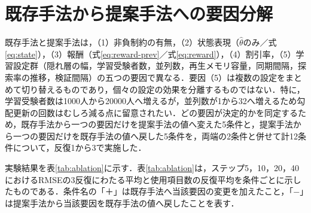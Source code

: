 \documentclass[a4paper,12pt,oneside,openany]{jsbook}
\begin{document}
\section{既存手法から提案手法への要因分解}\label{sec:ablation}

既存手法と提案手法は，（1）非負制約の有無，（2）状態表現（$\hat\theta$のみ／式\eqref{eq:state}），（3）報酬（式\eqref{eq:reward-prev}／式\eqref{eq:reward}），（4）割引率，（5）学習設定群（隠れ層の幅，学習受験者数，並列数，再生メモリ容量，同期間隔，探索率の推移，検証間隔）の五つの要因で異なる．要因（5）は複数の設定をまとめて切り替えるものであり，個々の設定の効果を分離するものではない．特に，学習受験者数は1000人から20000人へ増えるが，並列数が1から32へ増えるため勾配更新の回数はむしろ減る点に留意されたい．どの要因が決定的かを同定するため，既存手法から一つの要因だけを提案手法の値へ変えた5条件と，提案手法から一つの要因だけを既存手法の値へ戻した5条件を，両端の2条件と併せて計12条件について，反復1から3で実施した．

実験結果を表\ref{tab:ablation}に示す．表\ref{tab:ablation}は，ステップ5，10，20，40におけるRMSEの3反復にわたる平均と使用項目数の反復平均を条件ごとに示したものである．条件名の「＋」は既存手法へ当該要因の変更を加えたこと，「−」は提案手法から当該要因を既存手法の値へ戻したことを表す．
\end{document}
